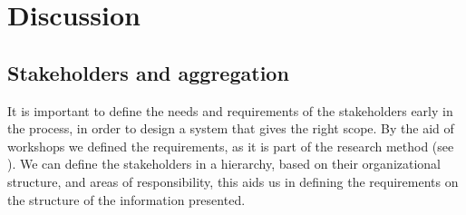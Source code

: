 \chapter{Discussion}
\label{chapter:discussion}

\section{Stakeholders and aggregation} %
\label{sec:discussion_stakeholders'_and_aggregation}
It is important to define the needs and requirements of the stakeholders 
early in the process, in order to design a system that gives the right scope. 
By the aid of workshops we defined the requirements, as it is part of the 
research method (see ). We can define the stakeholders in 
a hierarchy, based on their organizational structure, and areas of 
responsibility, this aids us in defining the requirements on the structure of 
the information presented.

